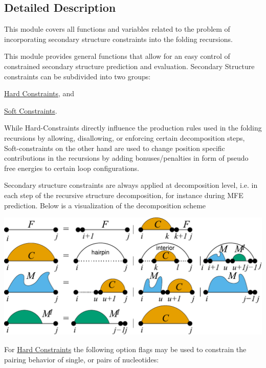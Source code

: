 \subsection{Detailed Description}
This module covers all functions and variables related to the problem of incorporating secondary structure constraints into the folding recursions. 

This module provides general functions that allow for an easy control of constrained secondary structure prediction and evaluation. Secondary Structure constraints can be subdivided into two groups\+:


\begin{DoxyItemize}
\item \hyperlink{group__hard__constraints}{Hard Constraints}, and
\item \hyperlink{group__soft__constraints}{Soft Constraints}.
\end{DoxyItemize}

While Hard-\/\+Constraints directly influence the production rules used in the folding recursions by allowing, disallowing, or enforcing certain decomposition steps, Soft-\/constraints on the other hand are used to change position specific contributions in the recursions by adding bonuses/penalties in form of pseudo free energies to certain loop configurations.

Secondary structure constraints are always applied at decomposition level, i.\+e. in each step of the recursive structure decomposition, for instance during M\+F\+E prediction. Below is a visualization of the decomposition scheme

 
\begin{DoxyImageNoCaption}
  \mbox{\includegraphics[width=\textwidth,height=\textheight/2,keepaspectratio=true]{recursions}}
\end{DoxyImageNoCaption}


For \hyperlink{group__hard__constraints}{Hard Constraints} the following option flags may be used to constrain the pairing behavior of single, or pairs of nucleotides\+:


